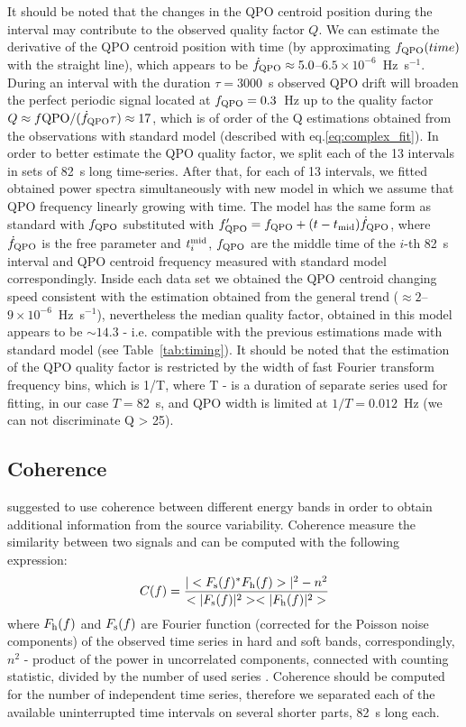\documentclass[a4paper,fleqn,usenatbib]{mnras}
\begin{document}
It should be noted that the changes in the QPO centroid position during the interval may contribute to the observed quality factor $Q$.
We can estimate the derivative of the QPO centroid position with time (by approximating $f_{\rm QPO}(time)$ with the straight line), which appears to be $\dot{f}_{\rm QPO} \approx 5.0$--$6.5\times10^{-6}$~Hz~s$^{-1}$. 
During an interval with the duration $\tau = 3000$~s observed QPO drift will broaden the perfect periodic signal located at $f_{\rm QPO}=0.3$~Hz up to the quality factor $Q \approx f{\rm QPO}/(\dot{f}_{\rm QPO}\tau) \approx 17$, which is of order of the Q estimations obtained from the observations with standard model (described with eq.\ref{eq:complex_fit}).
In order to better estimate the QPO quality factor, we split each of the 13 intervals in sets of 82~s long time-series. 
After that, for each of 13 intervals, we fitted obtained power spectra simultaneously with new model in which we assume that QPO frequency linearly growing with time. 
The model has the same form as standard with $f_{\rm QPO}$ substituted with $f_{\rm QPO}' = f_{\rm QPO} + (t - t_{\rm mid})\dot{f}_{\rm QPO}$, where $\dot{f}_{\rm QPO}$ is the free parameter and $t_{i}^{\rm mid}$, $f_{\rm QPO}$ are the middle time of the $i$-th 82~s interval and QPO centroid frequency measured with standard model correspondingly.
Inside each data set we obtained the QPO centroid changing speed consistent with the estimation obtained from the general trend ($\approx 2$--$9\times10^{-6}$~Hz~s$^{-1}$), nevertheless the median quality factor, obtained in this model appears to be $\sim14.3$ - i.e. compatible with the previous estimations made with standard model (see Table~\ref{tab:timing}). 
It should be noted that the estimation of the QPO quality factor is restricted by the width of fast Fourier transform frequency bins, which is 1/T, where T - is a duration of separate series used for fitting, in our case $T=82$~s, and QPO width is limited at $1/T = 0.012$~Hz (we can not discriminate Q > 25).

\subsection{Coherence}

\citet{1997ApJ...474L..43V} suggested to use coherence between different energy bands in order to obtain additional information from the source variability. 
Coherence measure the similarity between two signals and can be computed with the following expression:
\begin{equation}
        C(f) = \frac{|<F_{\rm s}(f)^*F_{\rm h}(f)>|^2 - n^2}{<|F_{\rm s}(f)|^2><|F_{\rm h}(f)|^2>}
    \label{eq:nowak_coh}
\end{equation}
where $F_{\rm h}(f)$ and $F_{\rm s}(f)$ are Fourier function (corrected for the Poisson noise components) of the observed time series in hard and soft bands, correspondingly, 
$n^2$ - product of the power in uncorrelated components, connected with counting statistic, divided by the number of used series \citep{1997ApJ...474L..43V}. 
Coherence should be computed for the number of independent time series, therefore we separated each of the available uninterrupted time intervals on several shorter parts, 82~s long each.  
\end{document}
